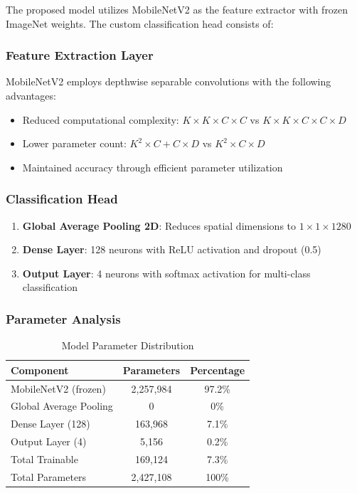 \documentclass[conference,10pt,letterpaper]{IEEEtran}
\begin{document}
The proposed model utilizes MobileNetV2 as the feature extractor with frozen ImageNet weights. The custom classification head consists of:

\subsubsection{Feature Extraction Layer}
MobileNetV2 employs depthwise separable convolutions with the following advantages:
\begin{itemize}
\item Reduced computational complexity: $K \times K \times C \times C$ vs $K \times K \times C \times C \times D$
\item Lower parameter count: $K^2 \times C + C \times D$ vs $K^2 \times C \times D$
\item Maintained accuracy through efficient parameter utilization
\end{itemize}

\subsubsection{Classification Head}
\begin{enumerate}
\item \textbf{Global Average Pooling 2D}: Reduces spatial dimensions to $1 \times 1 \times 1280$
\item \textbf{Dense Layer}: 128 neurons with ReLU activation and dropout (0.5)
\item \textbf{Output Layer}: 4 neurons with softmax activation for multi-class classification
\end{enumerate}

\subsubsection{Parameter Analysis}
\begin{table}[htbp]
\centering
\caption{Model Parameter Distribution}
\label{tab:parameters}
\begin{tabular}{lcc}
\toprule
Component & Parameters & Percentage \\
\midrule
MobileNetV2 (frozen) & 2,257,984 & 97.2\% \\
Global Average Pooling & 0 & 0\% \\
Dense Layer (128) & 163,968 & 7.1\% \\
Output Layer (4) & 5,156 & 0.2\% \\
\midrule
Total Trainable & 169,124 & 7.3\% \\
Total Parameters & 2,427,108 & 100\% \\
\bottomrule
\end{tabular}
\end{table}
\end{document}
